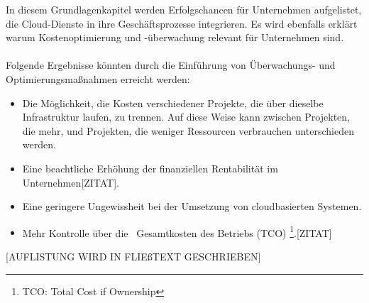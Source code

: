 In diesem Grundlagenkapitel werden Erfolgschancen für Unternehmen aufgelistet, die Cloud-Dienste in ihre Geschäftsprozesse integrieren.
Es wird ebenfalls erklärt warum Kostenoptimierung und -überwachung relevant für Unternehmen sind.
\\\\
Folgende Ergebnisse könnten durch die Einführung von Überwachungs- und Optimierungsmaßnahmen erreicht werden:
\begin{itemize}
      \item
            Die Möglichkeit, die Kosten verschiedener Projekte, die über dieselbe Infrastruktur laufen, zu trennen.
            Auf diese Weise kann zwischen Projekten, die mehr, und Projekten, die weniger Ressourcen verbrauchen unterschieden werden.%
      \item
            Eine beachtliche Erhöhung der finanziellen Rentabilität im Unternehmen[ZITAT].
      \item
            Eine geringere Ungewissheit bei der Umsetzung von cloudbasierten Systemen.
      \item
            Mehr Kontrolle über die  Gesamtkosten des Betriebs (TCO)     \footnote{TCO: Total Cost if Ownership}.[ZITAT]

\end{itemize}
[AUFLISTUNG WIRD IN FLIEßTEXT GESCHRIEBEN]



